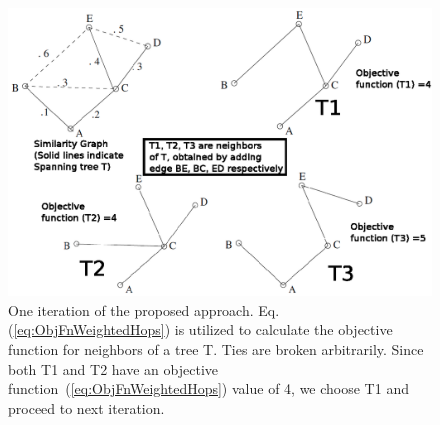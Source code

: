 \begin{figure}[htbp]
\begin{center}
\centering
\includegraphics[width=0.8\linewidth]{TagTree/LSOneiteration}
\caption[One iteration of the proposed approach. Eq. (\ref{eq:ObjFnWeightedHops}) is utilized to calculate the objective function for neighbors of a tree T. ]{One iteration of the proposed approach. Eq. (\ref{eq:ObjFnWeightedHops}) is utilized to calculate the objective function for neighbors of a tree T. Ties are broken arbitrarily. Since both T1 and T2 have an objective function~(\ref{eq:ObjFnWeightedHops}) value of 4, we choose T1 and proceed to next iteration. } 
\label{fig:neighborhood}
\end{center}
\end{figure}
